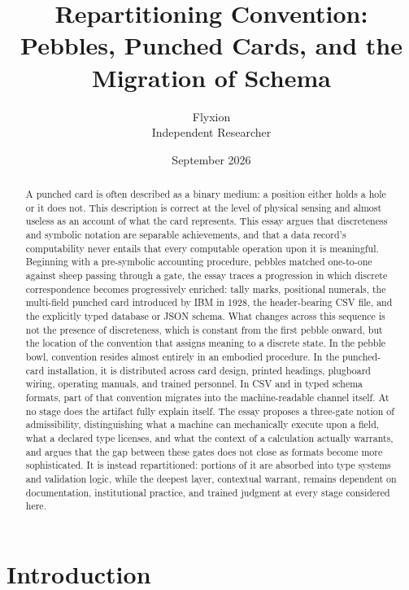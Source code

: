 \documentclass[11pt]{article}
\title{Repartitioning Convention: Pebbles, Punched Cards, and the Migration of Schema}
\author{Flyxion \\ \small Independent Researcher}
\date{September 2026}
\begin{document}
\maketitle

\begin{abstract}
A punched card is often described as a binary medium: a position either holds a hole or it does not. This description is correct at the level of physical sensing and almost useless as an account of what the card represents. This essay argues that discreteness and symbolic notation are separable achievements, and that a data record's computability never entails that every computable operation upon it is meaningful. Beginning with a pre-symbolic accounting procedure, pebbles matched one-to-one against sheep passing through a gate, the essay traces a progression in which discrete correspondence becomes progressively enriched: tally marks, positional numerals, the multi-field punched card introduced by IBM in 1928, the header-bearing CSV file, and the explicitly typed database or JSON schema. What changes across this sequence is not the presence of discreteness, which is constant from the first pebble onward, but the location of the convention that assigns meaning to a discrete state. In the pebble bowl, convention resides almost entirely in an embodied procedure. In the punched-card installation, it is distributed across card design, printed headings, plugboard wiring, operating manuals, and trained personnel. In CSV and in typed schema formats, part of that convention migrates into the machine-readable channel itself. At no stage does the artifact fully explain itself. The essay proposes a three-gate notion of admissibility, distinguishing what a machine can mechanically execute upon a field, what a declared type licenses, and what the context of a calculation actually warrants, and argues that the gap between these gates does not close as formats become more sophisticated. It is instead repartitioned: portions of it are absorbed into type systems and validation logic, while the deepest layer, contextual warrant, remains dependent on documentation, institutional practice, and trained judgment at every stage considered here.
\end{abstract}

\section{Introduction}
\end{document}
